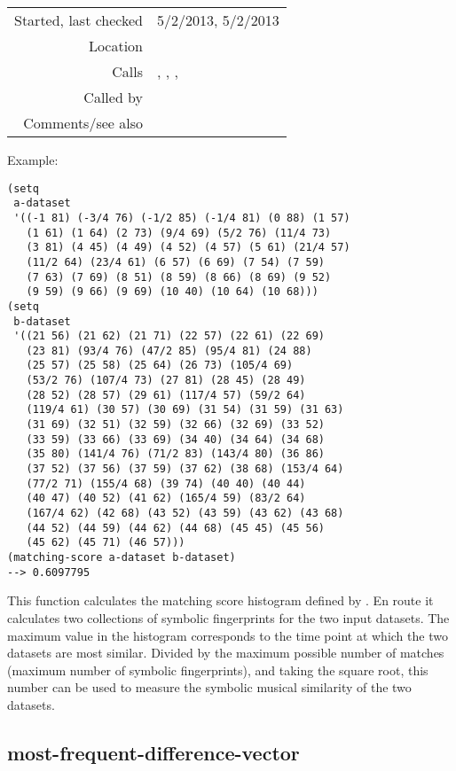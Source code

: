 \vspace{0.3cm}
\begin{tabular}{r|p{8cm}}
Started, last checked & 5/2/2013, 5/2/2013 \\
Location & \nameref{sec:robust-metrics} \\
Calls & \nameref{fun:cardinality-score}, \nameref{fun:matching-score-histogram}, \nameref{fun:max-item}, \nameref{fun:symbolic-fingerprint} \\
Called by & \nameref{fun:score-matrix} \\
Comments/see also &
\end{tabular}

\vspace{0.5cm}
\noindent Example:
\begin{verbatim}
(setq
 a-dataset
 '((-1 81) (-3/4 76) (-1/2 85) (-1/4 81) (0 88) (1 57)
   (1 61) (1 64) (2 73) (9/4 69) (5/2 76) (11/4 73)
   (3 81) (4 45) (4 49) (4 52) (4 57) (5 61) (21/4 57)
   (11/2 64) (23/4 61) (6 57) (6 69) (7 54) (7 59)
   (7 63) (7 69) (8 51) (8 59) (8 66) (8 69) (9 52)
   (9 59) (9 66) (9 69) (10 40) (10 64) (10 68)))
(setq
 b-dataset
 '((21 56) (21 62) (21 71) (22 57) (22 61) (22 69)
   (23 81) (93/4 76) (47/2 85) (95/4 81) (24 88)
   (25 57) (25 58) (25 64) (26 73) (105/4 69)
   (53/2 76) (107/4 73) (27 81) (28 45) (28 49)
   (28 52) (28 57) (29 61) (117/4 57) (59/2 64)
   (119/4 61) (30 57) (30 69) (31 54) (31 59) (31 63)
   (31 69) (32 51) (32 59) (32 66) (32 69) (33 52)
   (33 59) (33 66) (33 69) (34 40) (34 64) (34 68)
   (35 80) (141/4 76) (71/2 83) (143/4 80) (36 86)
   (37 52) (37 56) (37 59) (37 62) (38 68) (153/4 64)
   (77/2 71) (155/4 68) (39 74) (40 40) (40 44)
   (40 47) (40 52) (41 62) (165/4 59) (83/2 64)
   (167/4 62) (42 68) (43 52) (43 59) (43 62) (43 68)
   (44 52) (44 59) (44 62) (44 68) (45 45) (45 56)
   (45 62) (45 71) (46 57)))
(matching-score a-dataset b-dataset)
--> 0.6097795
\end{verbatim}

\noindent This function calculates the matching score
histogram defined by \cite{arzt2012}. En route it
calculates two collections of symbolic fingerprints
for the two input datasets. The maximum value in the
histogram corresponds to the time point at which the
two datasets are most similar. Divided by the maximum
possible number of matches (maximum number of symbolic
fingerprints), and taking the square root, this number
can be used to measure the symbolic musical similarity
of the two datasets.


\subsection*{most-frequent-difference-vector}\label{fun:most-frequent-difference-vector}

